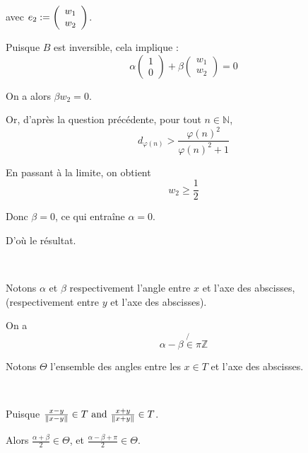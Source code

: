 avec $e_2 := \left( \begin{array}{c}
  w_1\\
  w_2
\end{array} \right)$.

Puisque $B$ est inversible, cela implique :
\[ \alpha \left( \begin{array}{c}
     1\\
     0
   \end{array} \right) + \beta \left( \begin{array}{c}
     w_1\\
     w_2
   \end{array} \right) = 0 \]


On a alors $\beta w_2 = 0$.

Or, d'apr{\`e}s la question pr{\'e}c{\'e}dente, pour tout $n \in \mathbb{N}$,
\[ d_{\varphi (n)} > \frac{\varphi (n)^2}{\varphi (n)^2 + 1} \]


En passant {\`a} la limite, on obtient
\[ w_2 \geqslant \frac{1}{2} \]


Donc $\beta = 0$, ce qui entra{\^i}ne $\alpha = 0$.

D'o{\`u} le r{\'e}sultat.

\

 Notons $\alpha$ et $\beta$ respectivement l'angle entre $x$ et
l'axe des abscisses, (respectivement entre $y$ et l'axe des abscisses).

On a
\[ \alpha - \beta \not{\in} \pi \mathbb{Z} \]


Notons $\Theta$ l'ensemble des angles entre les $x \in T$ et l'axe des
abscisses.

\

Puisque $\frac{x - y}{\| x - y \|} \in T \text{ and } \frac{x + y}{\| x + y \|}
\in T$.

Alors $\frac{\alpha + \beta}{2} \in \Theta$, et $\frac{\alpha - \beta + \pi}{2} \in \Theta$.


\

\begin{center}
\end{center}

